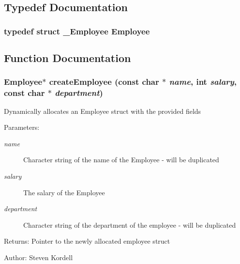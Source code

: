 \subsection{Typedef Documentation}
\subsubsection{\setlength{\rightskip}{0pt plus 5cm}typedef struct \bf{\_\-Employee} \bf{Employee}}\label{employeef_8h_1564d0f1c02c3b00afc832a9fd8ddb53}




\subsection{Function Documentation}
\subsubsection{\setlength{\rightskip}{0pt plus 5cm}\bf{Employee}$\ast$ create\-Employee (const char $\ast$ {\em name}, int {\em salary}, const char $\ast$ {\em department})}\label{employeef_8h_cfb476b211f5a9ecf37e52ae97b1e0be}


Dynamically allocates an Employee struct with the provided fields \begin{Desc}
\item[Parameters:]
\begin{description}
\item[{\em name}]Character string of the name of the Employee - will be duplicated \item[{\em salary}]The salary of the Employee \item[{\em department}]Character string of the department of the employee - will be duplicated \end{description}
\end{Desc}
\begin{Desc}
\item[Returns:]Pointer to the newly allocated employee struct \end{Desc}
\begin{Desc}
\item[Author:]Steven Kordell \end{Desc}
